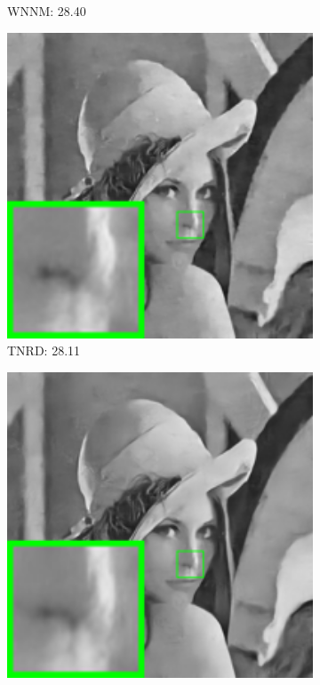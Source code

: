 \begin{figure}
\begin{adjustwidth}{-2cm}{}
\begin{subfigure}[t]{0.19\textwidth}
		\caption{WNNM: 28.40}
    \end{subfigure}
    \hfill
    \begin{subfigure}[t]{0.19\textwidth}
        \centering
        \includegraphics[width=1\textwidth]{images/twsc/awgn/resize_br_TNRD_60_lena.png}
		\caption{TNRD: 28.11}
    \end{subfigure}
    \hfill
    \begin{subfigure}[t]{0.19\textwidth}
        \centering
        \includegraphics[width=1\textwidth]{images/twsc/awgn/resize_br_DnCNN_60_lena.png}

\end{subfigure}
\end{adjustwidth}
\end{figure}
